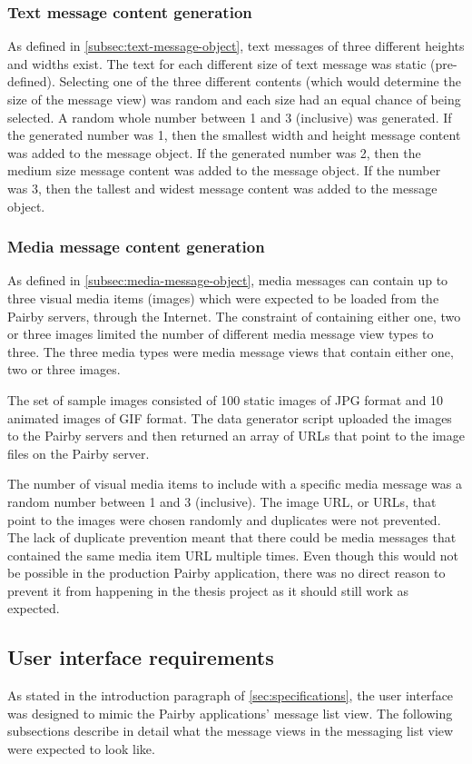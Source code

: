 \documentclass[a4paper,12pt]{article}
\begin{document}
\subsubsection{Text message content generation}
As defined in \autoref{subsec:text-message-object}, text messages of three different heights and widths exist. The text for each different size of text message was static (pre-defined). Selecting one of the three different contents (which would determine the size of the message view) was random and each size had an equal chance of being selected. A random whole number between 1 and 3 (inclusive) was generated. If the generated number was 1, then the smallest width and height message content was added to the message object. If the generated number was 2, then the medium size message content was added to the message object. If the number was 3, then the tallest and widest message content was added to the message object.

\subsubsection{Media message content generation}
As defined in \autoref{subsec:media-message-object}, media messages can contain up to three visual media items (images) which were expected to be loaded from the Pairby servers, through the Internet. The constraint of containing either one, two or three images limited the number of different media message view types to three. The three media types were media message views that contain either one, two or three images.

The set of sample images consisted of 100 static images of JPG format and 10 animated images of GIF format. The data generator script uploaded the images to the Pairby servers and then returned an array of URLs that point to the image files on the Pairby server.

The number of visual media items to include with a specific media message was a random number between 1 and 3 (inclusive). The image URL, or URLs, that point to the images were chosen randomly and duplicates were not prevented. The lack of duplicate prevention meant that there could be media messages that contained the same media item URL multiple times. Even though this would not be possible in the production Pairby application, there was no direct reason to prevent it from happening in the thesis project as it should still work as expected.

\subsection{User interface requirements}
As stated in the introduction paragraph of \autoref{sec:specifications}, the user interface was designed to mimic the Pairby applications' message list view. The following subsections describe in detail what the message views in the messaging list view were expected to look like.
\end{document}
